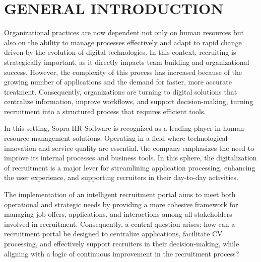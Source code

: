 ﻿\titlespacing*{\chapter}{0pt}{-2cm}{30pt}
\chapter*{GENERAL INTRODUCTION}
\titlespacing*{\chapter}{0pt}{0pt}{50pt}
\adjustmtc
\thispagestyle{MyStyle}

Organizational practices are now dependent not only on human resources but also on the ability to manage processes effectively and adapt to rapid change driven by the evolution of digital technologies. In this context, recruiting is strategically important, as it directly impacts team building and organizational success. However, the complexity of this process has increased because of the growing number of applications and the demand for faster, more accurate treatment. Consequently, organizations are turning to digital solutions that centralize information, improve workflows, and support decision-making, turning recruitment into a structured process that requires efficient tools.

\par

In this setting, Sopra HR Software is recognized as a leading player in human resource management solutions. Operating in a field where technological innovation and service quality are essential, the company emphasizes the need to improve its internal processes and business tools. In this sphere, the digitalization of recruitment is a major lever for streamlining application processing, enhancing the user experience, and supporting recruiters in their day-to-day activities.

\par

The implementation of an intelligent recruitment portal aims to meet both operational and strategic needs by providing a more cohesive framework for managing job offers, applications, and interactions among all stakeholders involved in recruitment. Consequently, a central question arises: how can a recruitment portal be designed to centralize applications, facilitate CV processing, and effectively support recruiters in their decision-making, while aligning with a logic of continuous improvement in the recruitment process?

